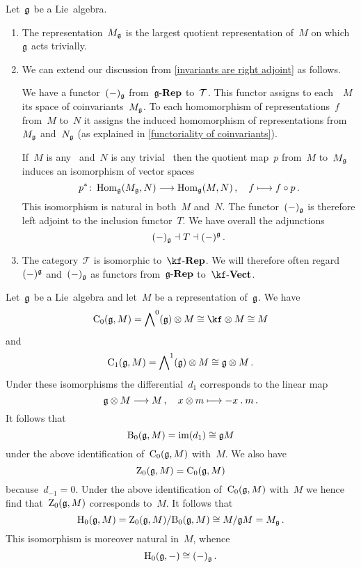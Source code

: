 \begin{remark}
  Let~$\glie$ be a Lie~algebra.
  \begin{enumerate}
    \item
      The representation~$M_{\mathfrak{g}}$ is the largest quotient representation of~$M$ on which~$\glie$ acts trivially.
    \item
      We can extend our discussion from \cref{invariants are right adjoint} as follows.

      We have a functor~$(-)_{\mathfrak{g}}$ from~$\mathfrak{g}\text{-}\mathbf{Rep}$ to~$\mathcal{T}$.
      This functor assigns to each~\representation{$\glie$}~$M$ its space of coinvariants~$M_{\mathfrak{g}}$.
      To each homomorphism of representations~$f$ from~$M$ to~$N$ it assigns the induced homomorphism of representations from~$M_{\mathfrak{g}}$ and~$N_{\mathfrak{g}}$ (as explained in \cref{functoriality of coinvariants}).

      If~$M$ is any~\representation{$\glie$} and~$N$ is any trivial~\representation{$\glie$} then the quotient map~$p$ from~$M$ to~$M_{\mathfrak{g}}$ induces an isomorphism of vector spaces
      \[
        p^*
        \colon
        \Hom_{\glie}(M_{\glie}, N)
        \to
        \Hom_{\glie}(M, N) \,,
        \quad
        f
        \mapsto
        f \circ p \,.
      \]
      This isomorphism is natural in both~$M$ and~$N$.
      The functor~$(-)_{\mathfrak{g}}$ is therefore left adjoint to the inclusion functor~$T$.
      We have overall the adjunctions
      \[
        (-)_{\mathfrak{g}}
        \dashv
        T
        \dashv
        (-)^{\mathfrak{g}} \,.
      \]
    \item
      The category~$\mathcal{T}$ is isomorphic to~$\cRep{\kf}$.
      We will therefore often regard~$(-)^{\mathfrak{g}}$ and~$(-)_{\mathfrak{g}}$ as functors from~$\mathfrak{g}\text{-}\mathbf{Rep}$ to~$\cVect{\kf}$.
  \end{enumerate}
\end{remark}


\begin{fluff}
  Let~$\glie$ be a Lie~algebra and let~$M$ be a representation of~$\glie$.
  We have
  \[
    \Chain_0(\glie, M)
    =
    \Exterior^0(\glie) \otimes M
    \cong
    \kf \otimes M
    \cong
    M
  \]
  and
  \[
    \operatorname{C}_1(\mathfrak{g}, M)
    =
    \operatorname{\bigwedge}^1(\mathfrak{g}) \otimes M
    \cong
    \mathfrak{g} \otimes M \,.
  \]
  Under these isomorphisms the differential~$d_1$ corresponds to the linear map
  \[
    \glie \otimes M
    \to
    M \,,
    \quad
    x \otimes m
    \mapsto
    - x \act m \,.
  \]
  It follows that
  \[
    \operatorname{B}_0(\mathfrak{g}, M)
    =
    \operatorname{im}(d_1)
    \cong
    \mathfrak{g} M
  \]
  under the above identification of~$\operatorname{C}_0(\mathfrak{g}, M)$ with~$M$.
  We also have
  \[
    \operatorname{Z}_0(\mathfrak{g}, M)
    =
    \operatorname{C}_0(\mathfrak{g}, M)
  \]
  because~$d_{-1} = 0$.
  Under the above identification of~$\operatorname{C}_0(\mathfrak{g}, M)$ with~$M$ we hence find that~$\operatorname{Z}_0(\mathfrak{g}, M)$ corresponds to~$M$.
  It follows that
  \[
    \operatorname{H}_0(\mathfrak{g}, M)
    =
    \operatorname{Z}_0(\mathfrak{g}, M) / { \operatorname{B}_0(\mathfrak{g}, M) }
    \cong
    M / \mathfrak{g} M
    =
    M_{\mathfrak{g}} \,.
  \]
  This isomorphism is moreover natural in~$M$, whence
  \[
    \operatorname{H}_0(\mathfrak{g}, -)
    \cong
    (-)_{\mathfrak{g}} \,.
  \]
\end{fluff}



